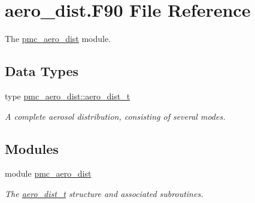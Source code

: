 \hypertarget{aero__dist_8_f90}{}\section{aero\+\_\+dist.\+F90 File Reference}
\label{aero__dist_8_f90}


The \mbox{\hyperlink{namespacepmc__aero__dist}{pmc\+\_\+aero\+\_\+dist}} module.  


\subsection*{Data Types}
\begin{DoxyCompactItemize}
\item 
type \mbox{\hyperlink{structpmc__aero__dist_1_1aero__dist__t}{pmc\+\_\+aero\+\_\+dist\+::aero\+\_\+dist\+\_\+t}}
\begin{DoxyCompactList}\small\item\em A complete aerosol distribution, consisting of several modes. \end{DoxyCompactList}\end{DoxyCompactItemize}
\subsection*{Modules}
\begin{DoxyCompactItemize}
\item 
module \mbox{\hyperlink{namespacepmc__aero__dist}{pmc\+\_\+aero\+\_\+dist}}
\begin{DoxyCompactList}\small\item\em The \mbox{\hyperlink{structpmc__aero__dist_1_1aero__dist__t}{aero\+\_\+dist\+\_\+t}} structure and associated subroutines. \end{DoxyCompactList}\end{DoxyCompactItemize}
